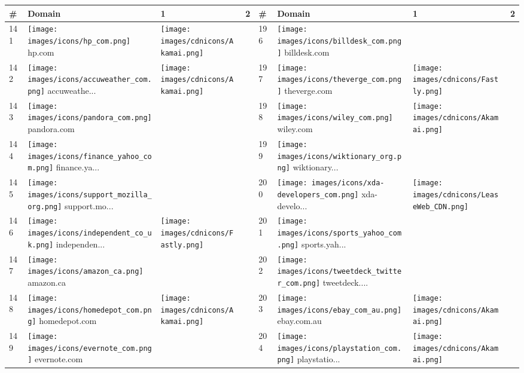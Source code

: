 \begin{table}[]
\centering
\begin{tabular}{|llll|llll|}
\hline
\# & Domain & 1 & 2 & \# & Domain & 1 & 2 \\
\hline
141 & \texttt{[image: images/icons/hp\_com.png]} hp.com & \texttt{[image: images/cdnicons/Akamai.png]} & & 196 & \texttt{[image: images/icons/billdesk\_com.png]} billdesk.com & & \\
142 & \texttt{[image: images/icons/accuweather\_com.png]} accuweathe... & \texttt{[image: images/cdnicons/Akamai.png]} & & 197 & \texttt{[image: images/icons/theverge\_com.png]} theverge.com & \texttt{[image: images/cdnicons/Fastly.png]} & \\
143 & \texttt{[image: images/icons/pandora\_com.png]} pandora.com & & & 198 & \texttt{[image: images/icons/wiley\_com.png]} wiley.com & \texttt{[image: images/cdnicons/Akamai.png]} & \\
144 & \texttt{[image: images/icons/finance\_yahoo\_com.png]} finance.ya... & & & 199 & \texttt{[image: images/icons/wiktionary\_org.png]} wiktionary... & & \\
145 & \texttt{[image: images/icons/support\_mozilla\_org.png]} support.mo... & & & 200 & \texttt{[image: images/icons/xda-developers\_com.png]} xda-develo... & \texttt{[image: images/cdnicons/LeaseWeb\_CDN.png]} & \\
146 & \texttt{[image: images/icons/independent\_co\_uk.png]} independen... & \texttt{[image: images/cdnicons/Fastly.png]} & & 201 & \texttt{[image: images/icons/sports\_yahoo\_com.png]} sports.yah... & & \\
147 & \texttt{[image: images/icons/amazon\_ca.png]} amazon.ca & & & 202 & \texttt{[image: images/icons/tweetdeck\_twitter\_com.png]} tweetdeck.... & & \\
148 & \texttt{[image: images/icons/homedepot\_com.png]} homedepot.com & \texttt{[image: images/cdnicons/Akamai.png]} & & 203 & \texttt{[image: images/icons/ebay\_com\_au.png]} ebay.com.au & \texttt{[image: images/cdnicons/Akamai.png]} & \\
149 & \texttt{[image: images/icons/evernote\_com.png]} evernote.com & & & 204 & \texttt{[image: images/icons/playstation\_com.png]} playstatio... & \texttt{[image: images/cdnicons/Akamai.png]} & \\

\end{tabular}
\end{table}
